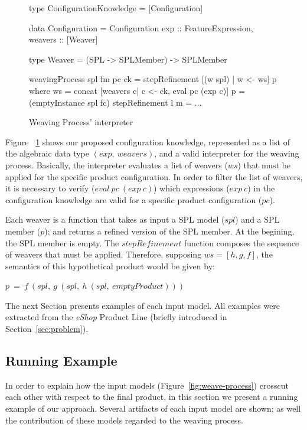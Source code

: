 \documentclass{acm_proc_article-sp}
\begin{document}
\begin{figure}[ht]
\begin{code}
type ConfigurationKnowledge = [Configuration]
 
data Configuration  = Configuration {
 exp :: FeatureExpression,
 weavers :: [Weaver] 	 
}

type Weaver = (SPL -> SPLMember) -> SPLMember

weavingProcess spl fm pc ck = 
   stepRefinement [(w spl) | w <- ws] p
   where 
    ws = concat [weavers c| c <- ck, eval pc (exp c)]
    p = (emptyInstance spl fc)
    stepRefinement l m = ...   	
\end{code}
\caption{Weaving Process' interpreter}
\label{fig:wp-semantics}
\end{figure}

Figure ~\ref{fig:wp-semantics} shows our proposed configuration knowledge,
represented as a list of the algebraic data type $(exp,\ weavers)$, and a valid
interpreter for the weaving process. Basically, 
the interpreter evaluates a list of weavers ($ws$) that must be applied for
the specific product configuration. In order to filter the list of weavers, it
is necessary to verify  ($eval\ pc\ (exp\ c)$) which expressions ($exp\ c$) in
the configuration knowledge are valid for a specific product configuration
($pc$).

Each weaver is a function that takes as input a SPL model
($spl$) and a SPL member ($p$); and returns a refined  
version of the SPL member. At the begining, the SPL member is empty. 
The $stepRefinement$ function composes the sequence of weavers that must
be applied. Therefore, supposing $ws = [h,g,f]$, the semantics of
this hypothetical product would be given by:

\begin{center}
$ p\ =\ f\ (spl,\ g\ (spl,\ h\ (spl,\ emptyProduct)))  $
\end{center}

The next Section presents examples of each input model. All examples were
extracted from the \emph{eShop} Product Line (briefly introduced in
Section~\ref{sec:problem}). 


\subsection{Running Example}
\label{sub:running}

In order to explain how the input models (Figure~\ref{fig:weave-process})
crosscut each other with respect to the final product, in this section we
present a running example of our approach. Several artifacts of each input model
are shown; as well the contribution of these models regarded to the weaving
process.
\end{document}
